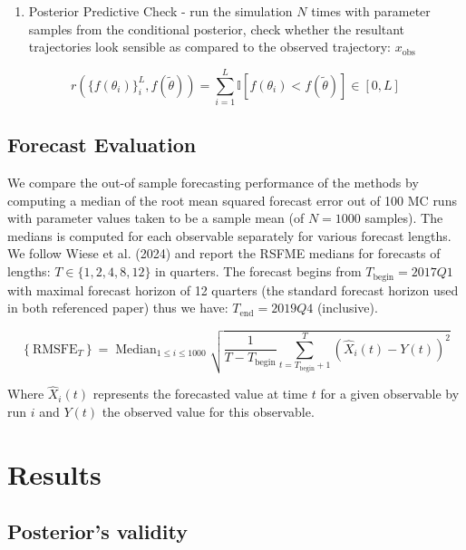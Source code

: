 \documentclass[12pt]{article}
\begin{document}
\begin{enumerate}
    \item Posterior Predictive Check - run the simulation $N$ times with parameter samples from the conditional posterior, check whether the resultant trajectories look sensible as compared to the observed trajectory: $x_\text{obs}$
    
\end{enumerate}

\begin{equation} \label{eq:rank_statistics}
    r\left( \{f(\theta_i)\}^L_i, f(\tilde{\theta}) \right) = \sum_{i = 1}^L\mathbb{I} \left[f(\theta_i) < f(\tilde{\theta}) \right] \in [0, L]
\end{equation}

\subsection{Forecast Evaluation} \label{sec:methodology_forecast}
We compare the out-of sample forecasting performance of the methods by computing a median of the root mean squared forecast error out of 100 MC runs with parameter values taken to be a sample mean (of $N = 1000$ samples). The medians is computed for each observable separately for various forecast lengths. We follow Wiese et al. (2024) and report the RSFME medians for forecasts of lengths: $T \in \{ 1, 2, 4, 8, 12 \}$ in quarters. The forecast begins from $T_\text{begin} = 2017Q1$ with maximal forecast horizon of 12 quarters (the standard forecast horizon used in both referenced paper) thus we have: $T_\text{end} = 2019Q4$ (inclusive). 

\begin{equation}
    \left\{ \text{RMSFE}_T \right\}  = \operatorname{Median}_{1 \leq i \leq 1000} \sqrt{ \frac{1}{T - T_\text{begin}} \sum_{t = T_\text{begin} + 1}^T \left( \hat{X}_i(t) - Y(t) \right)^2}
\end{equation}

Where $\hat{X}_i(t)$ represents the forecasted value at time $t$ for a given observable by run $i$ and $Y(t)$ the observed value for this observable. 
\section{Results}

\subsection{Posterior's validity} \label{sec:validity}
\end{document}
